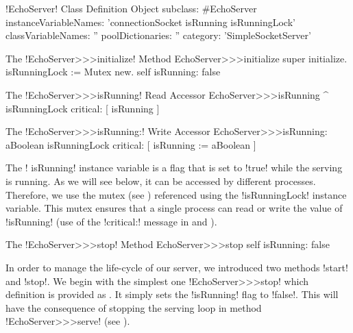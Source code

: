 \documentclass[a4paper,10pt,twoside]{book}
\begin{document}
\begin{classdef}[echoServerClassDef]{\ct!EchoServer! Class Definition}
Object subclass: #EchoServer
	instanceVariableNames: 'connectionSocket isRunning isRunningLock'
	classVariableNames: ''
	poolDictionaries: ''
	category: 'SimpleSocketServer'
\end{classdef}

\begin{method}{The \ct!EchoServer>>>initialize! Method}
EchoServer>>>initialize 
	super initialize.
	isRunningLock := Mutex new.
	self isRunning: false
\end{method}

\begin{method}{The \ct!EchoServer>>>isRunning! Read Accessor}
EchoServer>>>isRunning
	^ isRunningLock critical: [ isRunning ]
\end{method}

\begin{method}{The \ct!EchoServer>>>isRunning:! Write Accessor}
EchoServer>>>isRunning: aBoolean
	isRunningLock critical: [ isRunning := aBoolean ]
\end{method}

The \ct! isRunning! instance variable is a flag that is set to \ct!true! while the serving is running.
As we will see below, it can be accessed by different processes.
Therefore, we use the mutex (see ) referenced using the \ct!isRunningLock! instance variable.
This mutex ensures that a single process can read or write the value of \ct!isRunning! (use of the \ct!critical:! message in  and ).

\begin{method}{The \ct!EchoServer>>>stop! Method}
EchoServer>>>stop
	self isRunning: false
\end{method}

In order to manage the life-cycle of our server, we introduced two methods \ct!start! and \ct!stop!.
We begin with the simplest one \ct!EchoServer>>>stop! which definition is provided as .
It simply sets the \ct!isRunning! flag to \ct!false!.
This will have the consequence of stopping the serving loop in method \ct!EchoServer>>>serve! (see ). 
\end{document}
